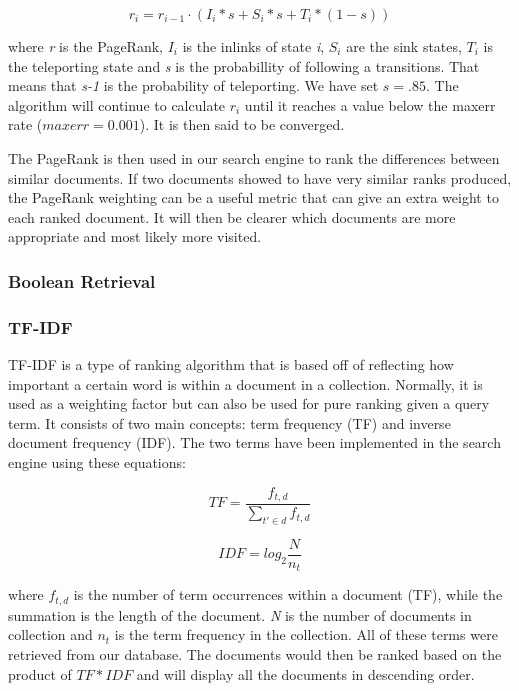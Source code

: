$$ r_i = r_{i-1} \cdot (I_i *s + S_i * s + T_i * (1-s)) $$ 

where \emph{r} is the PageRank, \emph{$I_i$} is the inlinks of state \emph{i}, \emph{$S_i$} are the sink states, \emph{$T_i$} is the teleporting state and \emph{s} is the probabillity of following a transitions. That means that \emph{s-1} is the probability of teleporting. We have set $s=.85$. The algorithm will continue to calculate \emph{$r_i$} until it reaches a value below the maxerr rate ($maxerr = 0.001$). It is then said to be converged. 

The PageRank is then used in our search engine to rank the differences between similar documents. If two documents showed to have very similar ranks produced, the PageRank weighting can be a useful metric that can give an extra weight to each ranked document. It will then be clearer which documents are more appropriate and most likely more visited. 



\subsubsection{Boolean Retrieval} %
\label{ssub:boolean_retrieval}


\subsubsection{TF-IDF} %
\label{sub:tf_idf}

TF-IDF is a type of ranking algorithm that is based off of reflecting how important a certain word is within a document in a collection. Normally, it is used as a weighting factor but can also be used for pure ranking given a query term. It consists of two main concepts:  term frequency (TF) and inverse document frequency (IDF). The two terms have been implemented in the search engine using these equations:

$$TF = \frac{f_{t,d}}{\sum\limits_{t' \in d} f_{t,d}}$$

$$IDF = log_2 \frac{N}{n_t}$$

where $f_{t,d}$ is the number of term occurrences within a document (TF), while the summation is the length of the document. \emph{N} is the number of documents in collection and $n_t$ is the term frequency in the collection. All of these terms were retrieved from our database. The documents would then be ranked based on the product of $TF * IDF$ and will display all the documents in descending order. 

